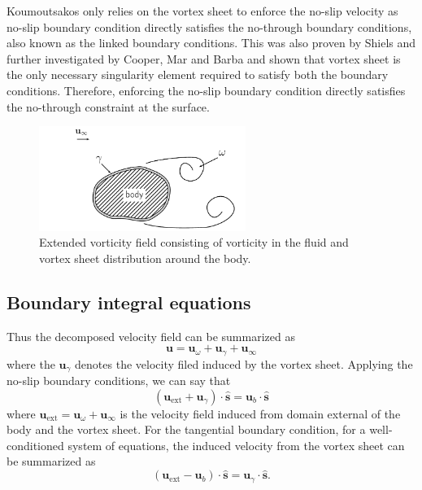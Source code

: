 Koumoutsakos \cite{Koumoutsakos1993} only relies on the vortex sheet to enforce the no-slip velocity as no-slip boundary condition directly satisfies the no-through boundary conditions, also known as the linked boundary conditions. This was also proven by Shiels \cite{Shiels1998} and further investigated by Cooper, Mar and Barba \cite{Cooper2009b} and shown that vortex sheet is the only necessary singularity element required to satisfy both the boundary conditions. Therefore, enforcing the no-slip boundary condition directly satisfies the no-through constraint at the surface.
	\begin{figure}[t]
	\centering
	\includegraphics[width=0.6\textwidth]{figures/lagrangian/noSlipVorticityField.pdf}
	\caption{Extended vorticity field consisting of vorticity in the fluid and vortex sheet distribution around the body.}
	\label{fig:noSlipVorticityField}
	\end{figure}

\subsection{Boundary integral equations}
Thus the decomposed velocity field can be summarized as
	\begin{equation}
	\mathbf{u} = \mathbf{u}_{\omega} + \mathbf{u}_{\gamma} + \mathbf{u}_{\infty}
	\end{equation}
where the $\mathbf{u}_{\gamma}$ denotes the velocity filed induced by the vortex sheet. Applying the no-slip boundary conditions, we can say that
	\begin{equation}
	\left(\mathbf{u}_{\mathrm{ext}} + \mathbf{u}_{\gamma}\right)\cdot\mathbf{\hat{s}} = \mathbf{u}_b \cdot \mathbf{\hat{s}}
	\label{eq:kinematicBCofVSOutside}
	\end{equation}
where $\mathbf{u}_{\mathrm{ext}} = \mathbf{u}_{\omega} + \mathbf{u}_{\infty}$ is the velocity field induced from domain external of the body and the vortex sheet. For the tangential boundary condition, for a well-conditioned system of equations, the induced velocity from the vortex sheet can be summarized as  
	\begin{equation}
	\left(\mathbf{u}_{\mathrm{ext}} - \mathbf{u}_b\right) \cdot \mathbf{\hat{s}} = \mathbf{u}_{\gamma}\cdot\mathbf{\hat{s}}.
	\label{eq:kinematicBCofVS}
	\end{equation}

